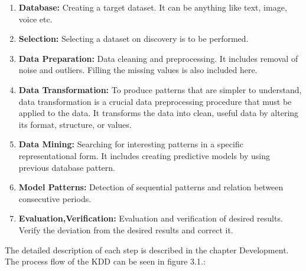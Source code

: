 \begin{enumerate}
	\item \textbf{Database:} Creating a target dataset. It can be anything like text, image, voice etc.
	\item \textbf{Selection:} Selecting a dataset on discovery is to be performed.
	\item \textbf{Data Preparation:} Data cleaning and preprocessing. It includes removal of noise and outliers. Filling the missing values is also included here.
	\item \textbf{Data Transformation:} To produce patterns that are simpler to understand, data transformation is a crucial data preprocessing procedure that must be applied to the data. It transforms the data into clean, useful data by altering its format, structure, or values. 
	\item \textbf{Data Mining:} Searching for interesting patterns in a specific representational form. It includes creating predictive models by using previous database pattern.
	\item \textbf{Model Patterns:} Detection of sequential patterns and relation between consecutive periods.	
	\item \textbf{Evaluation,Verification:} Evaluation and verification of desired results. Verify the deviation from the desired results and correct it.
\end{enumerate}


The detailed description of each step is described in the chapter Development. The process flow of the KDD can be seen in figure 3.1.: